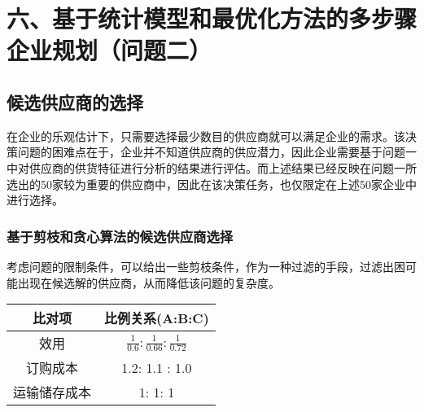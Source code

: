\documentclass{my_paper}
\begin{document}
\section{六、基于统计模型和最优化方法的多步骤企业规划（问题二）}

\subsection{候选供应商的选择}

在企业的乐观估计下，只需要选择最少数目的供应商就可以满足企业的需求。该决策问题的困难点在于，企业并不知道供应商的供应潜力，因此企业需要基于问题一中对供应商的供货特征进行分析的结果进行评估。而上述结果已经反映在问题一所选出的50家较为重要的供应商中，因此在该决策任务，也仅限定在上述50家企业中进行选择。

\subsubsection{基于剪枝和贪心算法的候选供应商选择}

考虑问题的限制条件，可以给出一些剪枝条件，作为一种过滤的手段，过滤出困可能出现在候选解的供应商，从而降低该问题的复杂度。

\begin{table}[h]
\centering
\begin{tabular}{cc}
\hline
比对项 & 比例关系(A:B:C) \\
\hline
效用 & $\frac{1}{0.6} : \frac{1}{0.66} : \frac{1}{0.72}$ \\
订购成本 & 1.2: 1.1 : 1.0  \\
运输储存成本 & 1: 1: 1\\

\end{tabular}
\end{table}
\end{document}
